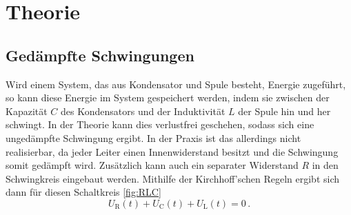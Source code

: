 \section{Theorie}
\label{sec:Theorie}
\subsection{Gedämpfte Schwingungen}
\label{sec:Gedämpfte_Schwingungen}

Wird einem System, das aus Kondensator und Spule besteht, Energie zugeführt, so kann
diese Energie im System gespeichert werden, indem sie zwischen der Kapazität $C$
des Kondensators und der Induktivität $L$ der Spule hin und her schwingt. In der
Theorie kann dies verlustfrei geschehen, sodass sich eine ungedämpfte Schwingung
ergibt. In der Praxis ist das allerdings nicht realisierbar, da jeder Leiter einen
Innenwiderstand besitzt und die Schwingung somit gedämpft wird. Zusätzlich kann auch
ein separater Widerstand $R$ in den Schwingkreis eingebaut werden. Mithilfe der Kirchhoff'schen
Regeln ergibt sich dann für diesen Schaltkreis \ref{fig:RLC}
\begin{equation}
  U_{\text{R}}(t)+U_{\text{C}}(t)+U_{\text{L}}(t)=0 \,.
\end{equation}

